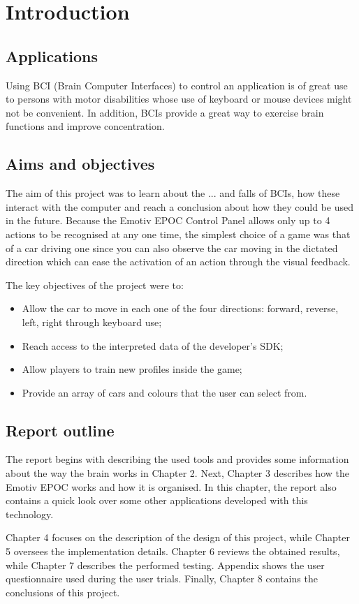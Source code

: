 \chapter{Introduction}
\label{cha:intro}

\section{Applications}

Using BCI (Brain Computer Interfaces) to control an application is of great use to persons with motor disabilities whose use of keyboard or mouse devices might not be convenient. In addition,  BCIs provide a great way to exercise brain functions and improve concentration.

\section{Aims and objectives}

The aim of this project was to learn about the ... and falls of BCIs, how these interact with the computer and reach a conclusion about how they could be used in the future. Because the Emotiv EPOC Control Panel allows only up to 4 actions to be recognised at any one time, the simplest choice of a game was that of a car driving one since you can also observe the car moving in the dictated direction which can ease the activation of an action through the visual feedback.

The key objectives of the project were to:
\begin{itemize}
	\item Allow the car to move in each one of the four directions: forward, reverse, left, right through keyboard use; 
	\item Reach access to the interpreted data of the developer's SDK;
	\item Allow players to train new profiles inside the game;
	\item Provide an array of cars and colours that the user can select from.
\end{itemize}

\section{Report outline}

The report begins with describing the used tools and provides some information about the way the brain works in Chapter 2. Next, Chapter 3 describes how the Emotiv EPOC works and how it is organised. In this chapter, the report also contains a quick look over some other applications developed with this technology.

Chapter 4 focuses on the description of the design of this project, while Chapter 5 oversees the implementation details. Chapter 6 reviews the obtained results, while Chapter 7 describes the performed testing. Appendix shows the user questionnaire used during the user trials. Finally, Chapter 8 contains the conclusions of this project.